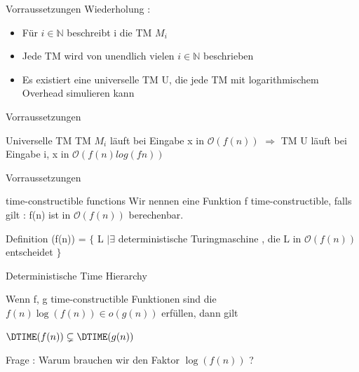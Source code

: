\begin{frame}{Vorraussetzungen}
	Wiederholung :
	\begin{itemize}[<+->]
		\item Für $i\in \mathbb{N}$ beschreibt i die TM $M_i$
		\item Jede TM wird von unendlich vielen $i\in \mathbb{N}$ beschrieben
		\item Es existiert eine universelle TM U, die jede TM mit logarithmischem Overhead 					simulieren kann
	\end{itemize}
\end{frame}
\begin{frame}{Vorraussetzungen}
	\begin{KITexampleblock}{Universelle TM}
	TM $M_i$ läuft bei Eingabe x in $\mathcal{O}(f(n))$
	$\Rightarrow$ TM U läuft bei Eingabe i, x in $\mathcal{O}(f(n)log(fn))$
	\end{KITexampleblock}
\end{frame}
\begin{frame}{Vorraussetzungen}
	\begin{KITinfoblock}{time-constructible functions}
		Wir nennen eine Funktion f time-constructible, falls gilt : \newline
		f(n) ist in $\mathcal{O}(f(n))$ berechenbar. 
	\end{KITinfoblock}
	
	\bigskip
	\pause	
	
	\begin{KITinfoblock}{Definition \DTIME }
		\DTIME(f(n)) = $\lbrace$ L $\vert \exists$ deterministische Turingmaschine ,
		 die L in $\mathcal{O}(f(n))$ entscheidet $\rbrace$
	\end{KITinfoblock}
\end{frame}
\begin{frame}{Deterministische Time Hierarchy}
	\begin{Satz}
	Wenn f, g  time-constructible Funktionen sind die  
	$f(n)\log(f(n)) \in o(g(n))$ erfüllen, dann gilt

		$\DTIME(f(n)) \subsetneq \DTIME(g(n))$
		
	\end{Satz}
	
	\pause

	Frage : Warum brauchen wir den Faktor $\log(f(n))$ ?
\end{frame}

